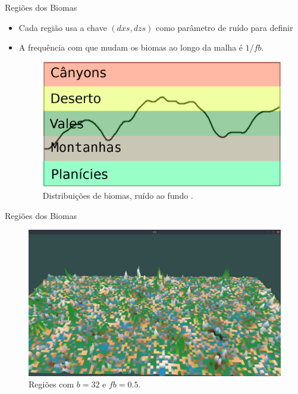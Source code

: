 \begin{frame}{Regiões dos Biomas}
    \begin{itemize} \setlength\itemsep{1em}
        \item Cada região usa a chave $(dxs, dzs)$ como parâmetro de ruído para definir
        \item A frequência com que mudam os biomas ao longo da malha é $1/fb$.
        \begin{figure}[H]
            \centering
            \includegraphics[width=.6\textwidth]{img/re2bfb/distnoise.png}
            \caption{Distribuições de biomas, ruído ao fundo \cite{shiffman2012nature}.}
            \label{fig:img_re2bfb_distnoise}
        \end{figure}
    \end{itemize}
\end{frame}

\begin{frame}{Regiões dos Biomas}
    \begin{figure}[H]
        \centering
        \includegraphics[width=.9\textwidth]{img/re2bfb/fb/05b32.png}
        \caption{Regiões com $b = 32$ e $fb = 0.5$.}
        \label{fig:img_re2bfb_fb_05b32}
    \end{figure}
    
    
\end{frame}

